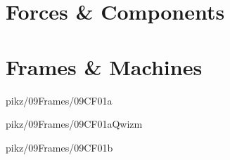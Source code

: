 \documentclass[9pt,xcolor={svgnames, x11names}]{beamer}
\begin{document}
\section{Forces \& Components}










\section{Frames \& Machines}


\begin{frame}{pikz/09Frames/09CF01a}
  
\end{frame}


\begin{frame}{pikz/09Frames/09CF01aQwizm}
  
\end{frame}


\begin{frame}{pikz/09Frames/09CF01b}
  
\end{frame}
\end{document}
